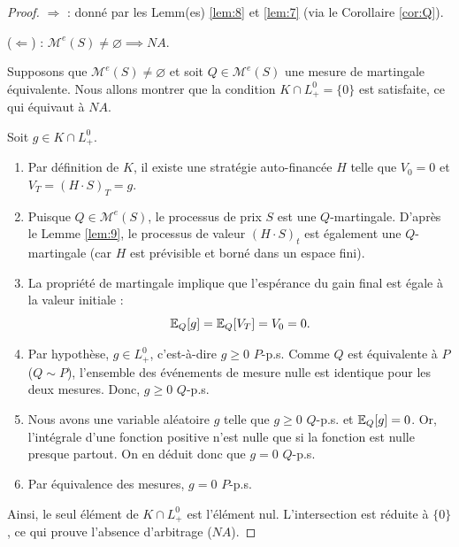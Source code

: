 \begin{proof}
\emph{$\Rightarrow$} : donné par les Lemm(es) \ref{lem:8} et \ref{lem:7} (via le Corollaire \ref{cor:Q}).

\smallskip
\noindent
(\emph{$\Leftarrow$}) :  $\mathcal{M}^e(S) \neq \varnothing \implies NA$.

\smallskip
Supposons que $\mathcal{M}^e(S) \neq \varnothing$ et soit $Q \in \mathcal{M}^e(S)$ une mesure de martingale équivalente.
Nous allons montrer que la condition $K \cap L_+^0 = \{0\}$ est satisfaite, ce qui équivaut à $NA$.

Soit $g \in K \cap L_+^0$.
\begin{enumerate}
    \item Par définition de $K$, il existe une stratégie auto-financée $H$ telle que $V_0 = 0$ et $V_T = (H \cdot S)_T = g$.
    \item Puisque $Q \in \mathcal{M}^e(S)$, le processus de prix $S$ est une $Q$-martingale. D'après le Lemme \ref{lem:9}, le processus de valeur $(H \cdot S)_t$ est également une $Q$-martingale (car $H$ est prévisible et borné dans un espace fini).
    \item La propriété de martingale implique que l'espérance du gain final est égale à la valeur initiale :
    \[
    \mathbb{E}_Q[g] = \mathbb{E}_Q[V_T] = V_0 = 0.
    \]
    \item Par hypothèse, $g \in L_+^0$, c'est-à-dire $g \ge 0$ $P$-p.s.
    Comme $Q$ est équivalente à $P$ ($Q \sim P$), l'ensemble des événements de mesure nulle est identique pour les deux mesures. Donc, $g \ge 0$ $Q$-p.s.
    \item Nous avons une variable aléatoire $g$ telle que $g \ge 0$ $Q$-p.s. et $\mathbb{E}_Q[g] = 0$.
    Or, l'intégrale d'une fonction positive n'est nulle que si la fonction est nulle presque partout.
    On en déduit donc que $g = 0$ $Q$-p.s.
    \item Par équivalence des mesures, $g = 0$ $P$-p.s.
\end{enumerate}
Ainsi, le seul élément de $K \cap L_+^0$ est l'élément nul. L'intersection est réduite à $\{0\}$, ce qui prouve l'absence d'arbitrage ($NA$).
\end{proof}

